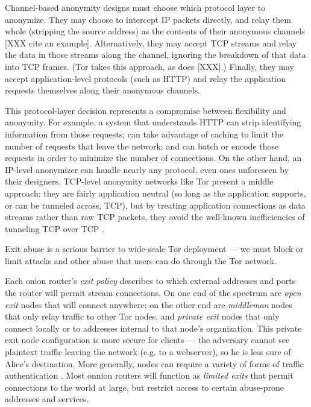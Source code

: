 \documentclass[times,10pt,twocolumn]{article}
\begin{document}

Channel-based anonymity designs must choose which protocol layer to
anonymize.  They may choose to intercept IP packets directly, and relay
them whole (stripping the source address) as the contents of their
anonymous channels [XXX cite an example].  Alternatively, they may
accept TCP streams and relay the data in those streams along the
channel, ignoring the breakdown of that data into TCP frames. (Tor takes
this approach, as does [XXX].)  Finally, they may accept
application-level protocols (such as HTTP) and relay the application
requests themselves along their anonymous channels.

This protocol-layer decision represents a compromise between flexibility
and anonymity.  For example, a system that understands HTTP can strip
identifying information from those requests; can take advantage of
caching to limit the number of requests that leave the network; and can
batch or encode those requests in order to minimize the number of
connections.  On the other hand, an IP-level anonymizer can handle
nearly any protocol, even ones unforeseen by their designers.  TCP-level
anonymity networks like Tor present a middle approach: they are fairly
application neutral (so long as the application supports, or can be
tunneled across, TCP), but by treating application connections as data
streams rather than raw TCP packets, they avoid the well-known
inefficiencies of tunneling TCP over TCP \cite{tcp-over-tcp-is-bad}.



\label{subsec:exitpolicies}

Exit abuse is a serious barrier to wide-scale Tor deployment --- we
must block or limit attacks and other abuse that users can do through
the Tor network.

Each onion router's \emph{exit policy} describes to which external
addresses and ports the router will permit stream connections. On one end
of the spectrum are \emph{open exit} nodes that will connect anywhere;
on the other end are \emph{middleman} nodes that only relay traffic to
other Tor nodes, and \emph{private exit} nodes that only connect locally
or to addresses internal to that node's organization. 
This private exit
node configuration is more secure for clients --- the adversary cannot
see plaintext traffic leaving the network (e.g. to a webserver), so he
is less sure of Alice's destination. More generally, nodes can require
a variety of forms of traffic authentication \cite{or-discex00}.
Most onnion routers will function as \emph{limited exits} that permit
connections to the world at large, but restrict access to certain abuse-prone
addresses and services.
\end{document}
